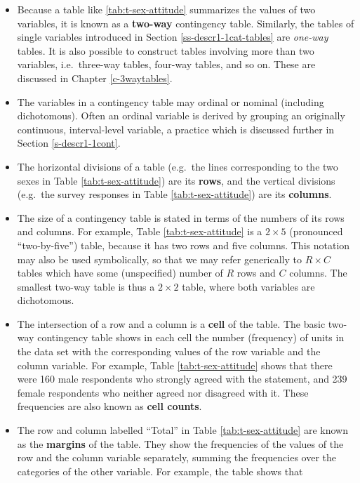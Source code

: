 \documentclass[11pt,a4paper,openany]{book}
\begin{document}
\begin{itemize}
\item
  Because a table like \ref{tab:t-sex-attitude} summarizes the values of
  two variables, it is known as a \textbf{two-way} contingency table.
  Similarly, the tables of single variables introduced in Section
  \ref{ss-descr1-1cat-tables} are \emph{one-way} tables. It is also
  possible to construct tables involving more than two variables,
  i.e.~three-way tables, four-way tables, and so on. These are discussed
  in Chapter \ref{c-3waytables}.
\item
  The variables in a contingency table may ordinal or nominal (including
  dichotomous). Often an ordinal variable is derived by grouping an
  originally continuous, interval-level variable, a practice which is
  discussed further in Section \ref{s-descr1-1cont}.
\item
  The horizontal divisions of a table (e.g.~the lines corresponding to
  the two sexes in Table \ref{tab:t-sex-attitude}) are its
  \textbf{rows}, and the vertical divisions (e.g.~the survey responses
  in Table \ref{tab:t-sex-attitude}) are its \textbf{columns}.
\item
  The size of a contingency table is stated in terms of the numbers of
  its rows and columns. For example, Table \ref{tab:t-sex-attitude} is a
  \(2\times 5\) (pronounced ``two-by-five'') table, because it has two
  rows and five columns. This notation may also be used symbolically, so
  that we may refer generically to \(R\times C\) tables which have some
  (unspecified) number of \(R\) rows and \(C\) columns. The smallest
  two-way table is thus a \(2\times 2\) table, where both variables are
  dichotomous.
\item
  The intersection of a row and a column is a \textbf{cell} of the
  table. The basic two-way contingency table shows in each cell the
  number (frequency) of units in the data set with the corresponding
  values of the row variable and the column variable. For example, Table
  \ref{tab:t-sex-attitude} shows that there were 160 male respondents
  who strongly agreed with the statement, and 239 female respondents who
  neither agreed nor disagreed with it. These frequencies are also known
  as \textbf{cell counts}.
\item
  The row and column labelled ``Total'' in Table
  \ref{tab:t-sex-attitude} are known as the \textbf{margins} of the
  table. They show the frequencies of the values of the row and the
  column variable separately, summing the frequencies over the
  categories of the other variable. For example, the table shows that

\end{itemize}
\end{document}
